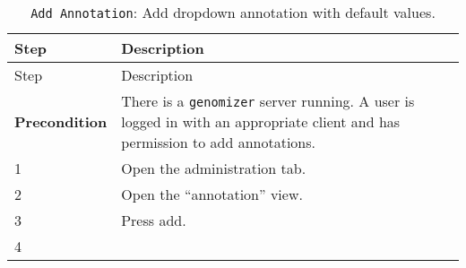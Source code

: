 \begin{longtable}[c]{@{}ll@{}}
\caption{\texttt{Add\ Annotation}: Add dropdown annotation with default
values.}\tabularnewline
\toprule
\begin{minipage}[b]{0.31\columnwidth}\raggedright\strut
Step
\strut\end{minipage} &
\begin{minipage}[b]{0.63\columnwidth}\raggedright\strut
Description
\strut\end{minipage}\tabularnewline
\midrule
\endfirsthead
\toprule
\begin{minipage}[b]{0.31\columnwidth}\raggedright\strut
Step
\strut\end{minipage} &
\begin{minipage}[b]{0.63\columnwidth}\raggedright\strut
Description
\strut\end{minipage}\tabularnewline
\midrule
\endhead
\begin{minipage}[t]{0.31\columnwidth}\raggedright\strut
\textbf{Precondition}
\strut\end{minipage} &
\begin{minipage}[t]{0.63\columnwidth}\raggedright\strut
There is a \texttt{genomizer} server running. A user is logged in with
an appropriate client and has permission to add annotations.
\strut\end{minipage}\tabularnewline
\begin{minipage}[t]{0.31\columnwidth}\raggedright\strut
1
\strut\end{minipage} &
\begin{minipage}[t]{0.63\columnwidth}\raggedright\strut
Open the administration tab.
\strut\end{minipage}\tabularnewline
\begin{minipage}[t]{0.31\columnwidth}\raggedright\strut
2
\strut\end{minipage} &
\begin{minipage}[t]{0.63\columnwidth}\raggedright\strut
Open the ``annotation'' view.
\strut\end{minipage}\tabularnewline
\begin{minipage}[t]{0.31\columnwidth}\raggedright\strut
3
\strut\end{minipage} &
\begin{minipage}[t]{0.63\columnwidth}\raggedright\strut
Press add.
\strut\end{minipage}\tabularnewline
\begin{minipage}[t]{0.31\columnwidth}\raggedright\strut
4
\strut\end{minipage} &

\end{longtable}
